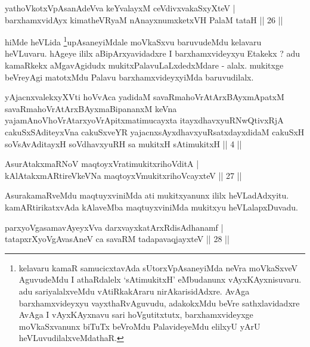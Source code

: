 \begin{shl}
yathoVkotxVpAsanAdeVva keYvalayxM ceVdivxvakaSxyXteV |\\
barxhamxvidAyx kimatheVRyaM nAnayxnumxketxVH PalaM tataH \hfill || 26 ||
\end{shl}

\begin{artha}
hiMde heVLida \footnote[2]{kelavaru kamaR samucicxtavAda sUtorxVpAsaneyiMda neVra moVkaSxveV AguvudeMdu I athaRdalelx `sAtimukitxH' eMbudanunx vAyxKAyxnisuvaru. adu sariyalalxveMdu vAtiRkakAraru nirAkarisidAdxre. AvAga barxhamxvideyxyu vayxthaRvAguvudu, adakokxMdu beVre sathxlavidadxre AvAga I vAyxKAyxnavu sari hoVgutitxtutx, barxhamxvideyxge moVkaSxvanunx biTuTx beVroMdu PalavideyeMdu elilxyU yArU heVLuvudilalxveMdathaR.}upAsaneyiMdale moVkaSxvu baruvudeMdu kelavaru heVLuvaru. hAgeye ililx aBipArxyavidadxre I barxhamxvideyxyu Etakekx ? adu kamaRkekx aMgavAgidudx mukitxPalavuLaLxdedxMdare - alalx. mukitxge beVreyAgi matotxMdu Palavu barxhamxvideyxyiMda baruvudilalx.
\end{artha}


\begin{shl}
yAjacnxvalekxyXVti hoVvAca yadidaM savaRmahoVrAtArxBAyxmApatxM savaRmahoVrAtArxBAyxmaBipananxM keVna yajamAnoV\s hoVrAtarxyoVrApitxmatimucayxta itayxdhavxyuRNwQtivxRjA cakuSxSAditeyxVna cakuSxveYR yajacnxsAyxdhavxyuRsatxdayxdidaM cakuSxH soV\s sAvAditayxH soV\s dhavxyuRH sa mukitxH sAtimukitxH || 4 ||
\end{shl}

\begin{shl}
AsurAtakxmaRNoV maqtoyxVratimukitxrihoVditA |\\
kAlAtakxmARtireVkeVNa maqtoyxVmukitxrihoVcayxteV \hfill || 27 ||
\end{shl}

\begin{artha}
AsurakamaRveMdu maqtuyxviniMda ati mukitxyanunx ililx heVLadAdxyitu. kamARtirikatxvAda kAlaveMba maqtuyxviniMda mukitxyu heVLalapxDuvadu.
\end{artha}


\begin{shl}
parxyoVgasamavAyeyxVva darxvayxkatArxRdisAdhanamf |\\
tatapxrXyoVgAvasAneV ca savaRM tadapavaqjayxteV \hfill || 28 ||
\end{shl}

